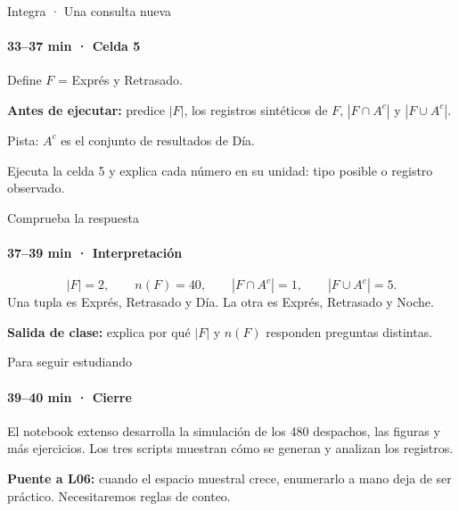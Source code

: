 \documentclass[aspectratio=169,11pt,spanish]{beamer}
\begin{document}
\begin{frame}{Integra · Una consulta nueva}
\framesubtitle{33–37 min · Celda 5}
Define $F$ = Exprés y Retrasado.

\medskip
\textbf{Antes de ejecutar:} predice $|F|$, los registros sintéticos de $F$, $|F\cap A^c|$ y $|F\cup A^c|$.

\medskip
Pista: $A^c$ es el conjunto de resultados de Día.

\medskip
Ejecuta la celda 5 y explica cada número en su unidad: tipo posible o registro observado.
\end{frame}
\begin{frame}{Comprueba la respuesta}
\framesubtitle{37–39 min · Interpretación}
\[
|F|=2,\qquad n(F)=40,\qquad
|F\cap A^c|=1,\qquad |F\cup A^c|=5.
\]
Una tupla es Exprés, Retrasado y Día. La otra es Exprés, Retrasado y Noche.

\medskip
\textbf{Salida de clase:} explica por qué $|F|$ y $n(F)$ responden preguntas distintas.
\end{frame}
\begin{frame}{Para seguir estudiando}
\framesubtitle{39–40 min · Cierre}
El notebook extenso desarrolla la simulación de los 480 despachos, las figuras y más ejercicios. Los tres scripts muestran cómo se generan y analizan los registros.

\medskip
\textbf{Puente a L06:} cuando el espacio muestral crece, enumerarlo a mano deja de ser práctico. Necesitaremos reglas de conteo.
\end{frame}
\end{document}
